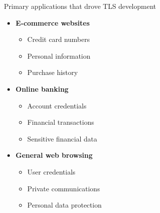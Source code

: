 \documentclass[aspectratio=169, lualatex, handout]{beamer}
\begin{document}
\begin{frame}{Primary applications that drove TLS development}
	\begin{itemize}
		\item \textbf{E-commerce websites}
		      \begin{itemize}
			      \item Credit card numbers
			      \item Personal information
			      \item Purchase history
		      \end{itemize}
		\item \textbf{Online banking}
		      \begin{itemize}
			      \item Account credentials
			      \item Financial transactions
			      \item Sensitive financial data
		      \end{itemize}
		\item \textbf{General web browsing}
		      \begin{itemize}
			      \item User credentials
			      \item Private communications
			      \item Personal data protection
		      \end{itemize}
	\end{itemize}
\end{frame}
\end{document}
